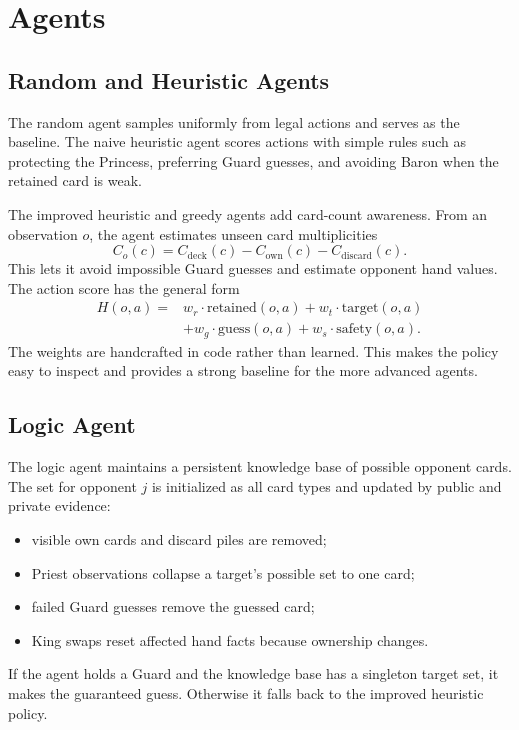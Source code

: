 \documentclass[10pt,twocolumn]{article}
\begin{document}
\section{Agents}

\subsection{Random and Heuristic Agents}

The random agent samples uniformly from legal actions and serves as the
baseline. The naive heuristic agent scores actions with simple rules such as
protecting the Princess, preferring Guard guesses, and avoiding Baron when the
retained card is weak.

The improved heuristic and greedy agents add card-count awareness. From an
observation $o$, the agent estimates unseen card multiplicities
\begin{equation}
C_o(c) = C_{\mathrm{deck}}(c) - C_{\mathrm{own}}(c) -
C_{\mathrm{discard}}(c).
\end{equation}
This lets it avoid impossible Guard guesses and estimate opponent hand values.
The action score has the general form
\begin{equation}
\begin{aligned}
H(o,a) ={}& w_r \cdot \mathrm{retained}(o,a)
+ w_t \cdot \mathrm{target}(o,a)\\
&+ w_g \cdot \mathrm{guess}(o,a)
+ w_s \cdot \mathrm{safety}(o,a).
\end{aligned}
\end{equation}
The weights are handcrafted in code rather than learned. This makes the policy
easy to inspect and provides a strong baseline for the more advanced agents.

\subsection{Logic Agent}

The logic agent maintains a persistent knowledge base of possible opponent
cards. The set for opponent $j$ is initialized as all card types and updated
by public and private evidence:
\begin{itemize}
    \item visible own cards and discard piles are removed;
    \item Priest observations collapse a target's possible set to one card;
    \item failed Guard guesses remove the guessed card;
    \item King swaps reset affected hand facts because ownership changes.
\end{itemize}
If the agent holds a Guard and the knowledge base has a singleton target set,
it makes the guaranteed guess. Otherwise it falls back to the improved
heuristic policy.
\end{document}
